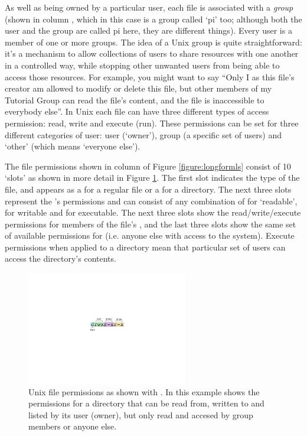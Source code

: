 As well as being owned by a particular user, each file is associated with a \textit{group} (shown in column \protect{}, which in this case is a group called `pi' too; although both the user and the group are called pi here, they are different things). Every user is a member of one or more groups. The idea of a Unix group is quite straightforward: it's a mechanism to allow collections of users to share resources with one another in a controlled way, while stopping other unwanted users from being able to access those resources. For example, you might want to say ``Only I as this file's creator am allowed to modify or delete this file, but other members of my Tutorial Group can read the file's content, and the file is inaccessible to everybody else''. In Unix each file can have three different types of access permission: read, write and execute (run). These permissions can be set for three different categories of user: user (`owner'), group (a specific set of users) and `other' (which means `everyone else').

The file permissions shown in column \protect{} of Figure \ref{figure:longformls} consist of 10 `slots' as shown in more detail in Figure \ref{figure:fileperms}. The first slot indicates the type of the file, and appears as a \ttout{-} for a regular file or a  for a directory. The next three slots represent the 's  permissions and can consist of any combination of  for `readable',  for writable and  for executable. The next three slots show the read/write/execute permissions for members of the file's , and the last three slots show the same set of available permissions for  (i.e. anyone else with access to the system). Execute permissions when applied to a directory mean that particular set of users can access the directory's contents.

\begin{figure}
\centerline{\includegraphics[width=7cm]{images/filepermissions}}
\caption{Unix file permissions as shown with . In this example shows the permissions for a directory that can be read from, written to and listed by its user (owner), but only read and accesed by group members or anyone else.}\label{figure:fileperms}
\end{figure}

